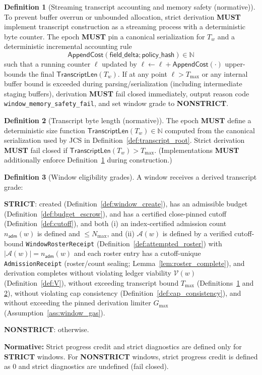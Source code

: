 \documentclass[11pt]{article}
\newcommand{\MUST}{\textbf{MUST}}
\newcommand{\code}[1]{\texttt{#1}}
\newcommand{\N}{\mathbb{N}}
\newcommand{\1}{\mathbf{1}}
\theoremstyle{definition}
\newtheorem{definition}{Definition}
\theoremstyle{plain}
\begin{document}
\begin{definition}[Streaming transcript accounting and memory safety (normative)]
\label{def:streaming_len}
To prevent buffer overrun or unbounded allocation, strict derivation \MUST{} implement transcript construction as a streaming process with a deterministic byte counter.
The epoch \MUST{} pin a canonical serialization for $T_w$ and a deterministic incremental accounting rule
\[
\mathsf{AppendCost}(\textsf{field\_delta};\textsf{policy\_hash})\in\N
\]
such that a running counter $\ell$ updated by $\ell\leftarrow \ell+\mathsf{AppendCost}(\cdot)$ upper-bounds the final $\mathsf{TranscriptLen}(T_w)$.
If at any point $\ell>T_{\max}$ or any internal buffer bound is exceeded during parsing/serialization (including intermediate staging buffers), derivation \MUST{} fail closed immediately, output reason code \code{window\_memory\_safety\_fail}, and set window grade to \textbf{NONSTRICT}.
\end{definition}

\begin{definition}[Transcript byte length (normative)]
\label{def:transcript_len}
The epoch \MUST{} define a deterministic size function $\mathsf{TranscriptLen}(T_w)\in\N$ computed from the canonical serialization used by \textsf{JCS} in Definition~\ref{def:transcript_root}. Strict derivation \MUST{} fail closed if $\mathsf{TranscriptLen}(T_w)>T_{\max}$.
(Implementations \MUST{} additionally enforce Definition~\ref{def:streaming_len} during construction.)
\end{definition}

\begin{definition}[Window eligibility grades]
\label{def:grade}
A window receives a derived transcript grade:
\begin{tightitemize}
\item \textbf{STRICT}: created (Definition~\ref{def:window_create}), has an admissible budget (Definition~\ref{def:budget_escrow}), and has a certified close-pinned cutoff (Definition~\ref{def:cutoff}), and both (i) an index-certified admission count $n_{\textsf{adm}}(w)$ is defined and $\le N_{\max}$, and (ii) $\mathcal{A}(w)$ is defined by a verified cutoff-bound \code{WindowRosterReceipt} (Definition~\ref{def:attempted_roster}) with $|\mathcal{A}(w)|=n_{\textsf{adm}}(w)$ and each roster entry has a cutoff-unique \code{AdmissionReceipt} (roster/count sealing; Lemma~\ref{lem:roster_complete}), and derivation completes without violating ledger viability $\mathcal{V}(w)$ (Definition~\ref{def:V}), without exceeding transcript bound $T_{\max}$ (Definitions~\ref{def:streaming_len} and \ref{def:transcript_len}), without violating cap consistency (Definition~\ref{def:cap_consistency}), and without exceeding the pinned derivation limiter $G_{\max}$ (Assumption~\ref{ass:window_gas}).
\item \textbf{NONSTRICT}: otherwise.
\end{tightitemize}
\textbf{Normative:} Strict progress credit and strict diagnostics are defined only for \textbf{STRICT} windows. For \textbf{NONSTRICT} windows, strict progress credit is defined as $0$ and strict diagnostics are undefined (fail closed).
\end{definition}
\end{document}
